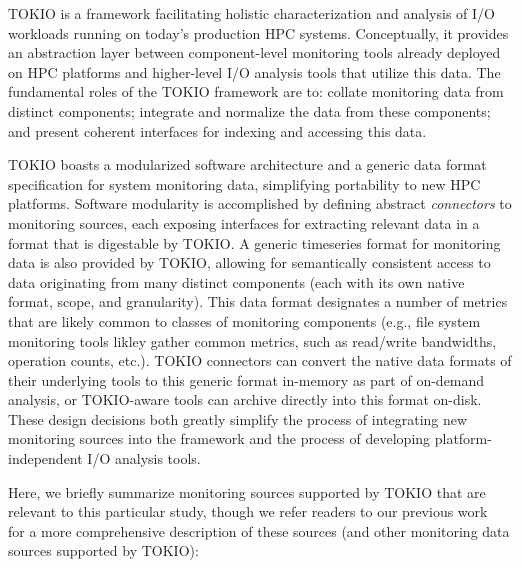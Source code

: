 
TOKIO is a framework facilitating holistic characterization and analysis of I/O workloads running on today's production HPC systems. Conceptually, it provides an abstraction layer between component-level monitoring tools already deployed on HPC platforms and higher-level I/O analysis tools that utilize this data. The fundamental roles of the TOKIO framework are to: collate monitoring data from distinct components; integrate and normalize the data from these components; and present coherent interfaces for indexing and accessing this data.

TOKIO boasts a modularized software architecture and a generic data format specification for system monitoring data, simplifying portability to new HPC platforms. Software modularity is accomplished by defining abstract \textit{connectors} to monitoring sources, each exposing interfaces for extracting relevant data in a format that is digestable by TOKIO.  A generic timeseries format for monitoring data is also provided by TOKIO, allowing for semantically consistent access to data originating from many distinct components (each with its own native format, scope, and granularity). This data format designates a number of metrics that are likely common to classes of monitoring components (e.g., file system monitoring tools likley gather common metrics, such as read/write bandwidths, operation counts, etc.). TOKIO connectors can convert the native data formats of their underlying tools to this generic format in-memory as part of on-demand analysis, or TOKIO-aware tools can archive directly into this format on-disk. These design decisions both greatly simplify the process of integrating new monitoring sources into the framework and the process of developing platform-independent I/O analysis tools.

Here, we briefly summarize monitoring sources supported by TOKIO that are relevant to this particular study, though we refer readers to our previous work~\cite{Lockwood2017, Lockwood2018tokio} for a more comprehensive description of these sources (and other monitoring data sources supported by TOKIO):

